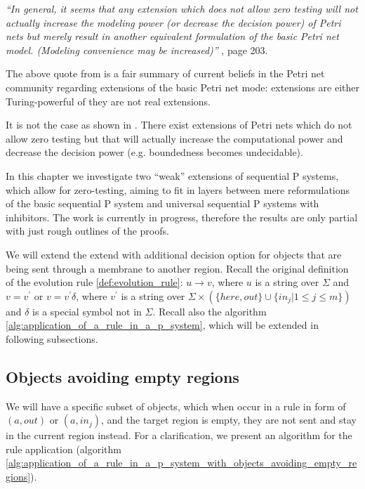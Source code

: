 {\em ``In general, it seems that any extension which does not allow zero testing will not actually increase the modeling power (or decrease the decision power) of Petri nets but merely result in another equivalent formulation of the basic Petri net model. (Modeling convenience may be increased)''} \cite{Peterson81PetriNets}, page 203.

The above quote from \cite{Peterson81PetriNets} is a fair summary of current beliefs in the Petri net community regarding extensions of the basic Petri net mode: extensions are either Turing-powerful of they are not real extensions.

It is not the case as shown in \cite{Dufourd98Reset}. There exist extensions of Petri nets which do not allow zero testing but that will actually increase the computational power and decrease the decision power (e.g. boundedness becomes undecidable).

In this chapter we investigate two ``weak'' extensions of sequential P systems, which allow for zero-testing, aiming to fit in layers between mere reformulations of the basic sequential P system and universal sequential P systems with inhibitors. The work is currently in progress, therefore the results are only partial with just rough outlines of the proofs.

We will extend the extend with additional decision option for objects that are being sent through a membrane to another region. Recall the original definition of the evolution rule \ref{def:evolution_rule}: $u\rightarrow v$, where $u$ is a string over $\Sigma$ and $v=v^\prime$ or $v=v^\prime\delta$, where $v^\prime$ is a string over $\Sigma\times(\{here, out\}\cup\{in_j|1\leq j\leq m\})$ and $\delta$ is a special symbol not in $\Sigma$. Recall also the algorithm \ref{alg:application_of_a_rule_in_a_p_system}, which will be extended in following subsections.

\subsection{Objects avoiding empty regions} %
\label{sub:objects_avoiding_empty_regions}

We will have a specific subset of objects, which when occur in a rule in form of $(a, out)$ or $(a, in_j)$, and the target region is empty, they are not sent and stay in the current region instead. For a clarification, we present an algorithm for the rule application  (algorithm \ref{alg:application_of_a_rule_in_a_p_system_with_objects_avoiding_empty_regions}).


